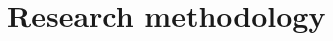 \documentclass[letterpaper%
, twoside%
, 12pt%
,these%
, english%
,creativecommons,hyperref, withAlgo2e %
]{thETS}
\begin{document}

\chapter{Research methodology}
\end{document}
